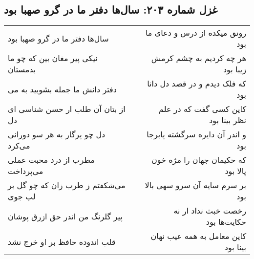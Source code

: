 \begin{center}
\section*{غزل شماره ۲۰۳: سال‌ها دفتر ما در گرو صهبا بود}
\label{sec:sh203}
\begin{longtable}{l p{0.5cm} r}
سال‌ها دفتر ما در گرو صهبا بود
&&
رونق میکده از درس و دعای ما بود
\\
نیکی پیر مغان بین که چو ما بدمستان
&&
هر چه کردیم به چشم کرمش زیبا بود
\\
دفتر دانش ما جمله بشویید به می
&&
که فلک دیدم و در قصد دل دانا بود
\\
از بتان آن طلب ار حسن شناسی ای دل
&&
کاین کسی گفت که در علم نظر بینا بود
\\
دل چو پرگار به هر سو دورانی می‌کرد
&&
و اندر آن دایره سرگشته پابرجا بود
\\
مطرب از درد محبت عملی می‌پرداخت
&&
که حکیمان جهان را مژه خون پالا بود
\\
می‌شکفتم ز طرب زان که چو گل بر لب جوی
&&
بر سرم سایه آن سرو سهی بالا بود
\\
پیر گلرنگ من اندر حق ازرق پوشان
&&
رخصت خبث نداد ار نه حکایت‌ها بود
\\
قلب اندوده حافظ بر او خرج نشد
&&
کاین معامل به همه عیب نهان بینا بود
\\
\end{longtable}
\end{center}
